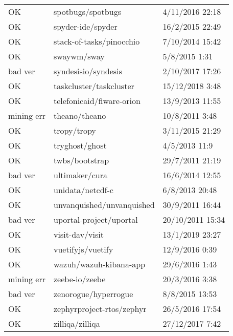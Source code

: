 \begin{appendices}
\begin{center}
\begin{longtable}{|l|l|l|}
            OK & spotbugs/spotbugs & 4/11/2016 22:18 \\
            OK & spyder-ide/spyder & 16/2/2015 22:49 \\
            OK & stack-of-tasks/pinocchio & 7/10/2014 15:42 \\
            OK & swaywm/sway & 5/8/2015 1:31 \\
            bad ver & syndesisio/syndesis & 2/10/2017 17:26 \\
            OK & taskcluster/taskcluster & 15/12/2018 3:48 \\
            OK & telefonicaid/fiware-orion & 13/9/2013 11:55 \\
            mining err & theano/theano & 10/8/2011 3:48 \\
            OK & tropy/tropy & 3/11/2015 21:29 \\
            OK & tryghost/ghost & 4/5/2013 11:9 \\
            OK & twbs/bootstrap & 29/7/2011 21:19 \\
            bad ver & ultimaker/cura & 16/6/2014 12:55 \\
            OK & unidata/netcdf-c & 6/8/2013 20:48 \\
            OK & unvanquished/unvanquished & 30/9/2011 16:44 \\
            bad ver & uportal-project/uportal & 20/10/2011 15:34 \\
            OK & visit-dav/visit & 13/1/2019 23:27 \\
            OK & vuetifyjs/vuetify & 12/9/2016 0:39 \\
            OK & wazuh/wazuh-kibana-app & 29/6/2016 1:43 \\
            mining err & zeebe-io/zeebe & 20/3/2016 3:38 \\
            bad ver & zenorogue/hyperrogue & 8/8/2015 13:53 \\
            OK & zephyrproject-rtos/zephyr & 26/5/2016 17:54 \\
            OK & zilliqa/zilliqa & 27/12/2017 7:42 \\
            \end{longtable}
    \end{center}
\end{appendices}
